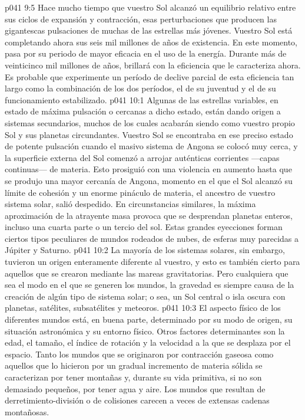 \vs p041 9:5 Hace mucho tiempo que vuestro Sol alcanzó un equilibrio relativo entre sus ciclos de expansión y contracción, esas perturbaciones que producen las gigantescas pulsaciones de muchas de las estrellas más jóvenes. Vuestro Sol está completando ahora sus seis mil millones de años de existencia. En este momento, pasa por su periodo de mayor eficacia en el uso de la energía. Durante más de veinticinco mil millones de años, brillará con la eficiencia que le caracteriza ahora. Es probable que experimente un período de declive parcial de esta eficiencia tan largo como la combinación de los dos períodos, el de su juventud y el de su funcionamiento estabilizado.
\vs p041 10:1 Algunas de las estrellas variables, en estado de máxima pulsación o cercanas a dicho estado, están dando origen a sistemas secundarios, muchos de los cuales acabarán siendo como vuestro propio Sol y sus planetas circundantes. Vuestro Sol se encontraba en ese preciso estado de potente pulsación cuando el masivo sistema de Angona se colocó muy cerca, y la superficie externa del Sol comenzó a arrojar auténticas corrientes ---capas continuas--- de materia. Esto prosiguió con una violencia en aumento hasta que se produjo una mayor cercanía de Angona, momento en el que el Sol alcanzó su límite de cohesión y un enorme pináculo de materia, el ancestro de vuestro sistema solar, salió despedido. En circunstancias similares, la máxima aproximación de la atrayente masa provoca que se desprendan planetas enteros, incluso una cuarta parte o un tercio del sol. Estas grandes eyecciones forman ciertos tipos peculiares de mundos rodeados de nubes, de esferas muy parecidas a Júpiter y Saturno.
\vs p041 10:2 La mayoría de los sistemas solares, sin embargo, tuvieron un origen enteramente diferente al vuestro, y esto es también cierto para aquellos que se crearon mediante las mareas gravitatorias. Pero cualquiera que sea el modo en el que se generen los mundos, la gravedad es siempre causa de la creación de algún tipo de sistema solar; o sea, un Sol central o isla oscura con planetas, satélites, subsatélites y meteoros.
\vs p041 10:3 \pc El aspecto físico de los diferentes mundos está, en buena parte, determinado por su modo de origen, su situación astronómica y su entorno físico. Otros factores determinantes son la edad, el tamaño, el índice de rotación y la velocidad a la que se desplaza por el espacio. Tanto los mundos que se originaron por contracción gaseosa como aquellos que lo hicieron por un gradual incremento de materia sólida se caracterizan por tener montañas y, durante su vida primitiva, si no son demasiado pequeños, por tener agua y aire. Los mundos que resultan de derretimiento\hyp{}división o de colisiones carecen a veces de extensas cadenas montañosas.

